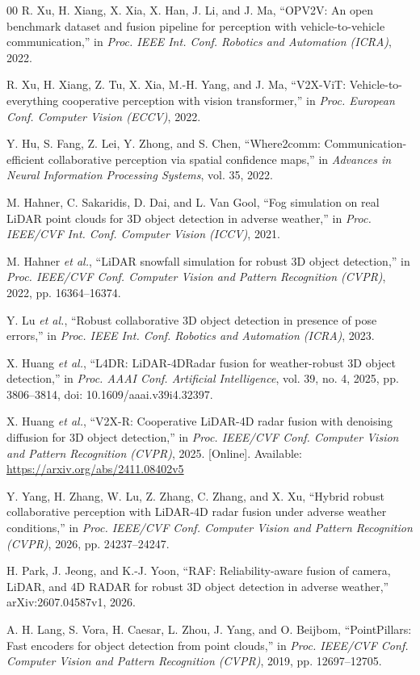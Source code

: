 \begin{thebibliography}{00}
R. Xu, H. Xiang, X. Xia, X. Han, J. Li, and J. Ma, ``OPV2V: An open benchmark dataset and fusion pipeline for perception with vehicle-to-vehicle communication,'' in \emph{Proc. IEEE Int. Conf. Robotics and Automation (ICRA)}, 2022.

R. Xu, H. Xiang, Z. Tu, X. Xia, M.-H. Yang, and J. Ma, ``V2X-ViT: Vehicle-to-everything cooperative perception with vision transformer,'' in \emph{Proc. European Conf. Computer Vision (ECCV)}, 2022.

Y. Hu, S. Fang, Z. Lei, Y. Zhong, and S. Chen, ``Where2comm: Communication-efficient collaborative perception via spatial confidence maps,'' in \emph{Advances in Neural Information Processing Systems}, vol. 35, 2022.

M. Hahner, C. Sakaridis, D. Dai, and L. Van Gool, ``Fog simulation on real LiDAR point clouds for 3D object detection in adverse weather,'' in \emph{Proc. IEEE/CVF Int. Conf. Computer Vision (ICCV)}, 2021.

M. Hahner \emph{et al.}, ``LiDAR snowfall simulation for robust 3D object detection,'' in \emph{Proc. IEEE/CVF Conf. Computer Vision and Pattern Recognition (CVPR)}, 2022, pp. 16364--16374.

Y. Lu \emph{et al.}, ``Robust collaborative 3D object detection in presence of pose errors,'' in \emph{Proc. IEEE Int. Conf. Robotics and Automation (ICRA)}, 2023.

X. Huang \emph{et al.}, ``L4DR: LiDAR-4DRadar fusion for weather-robust 3D object detection,'' in \emph{Proc. AAAI Conf. Artificial Intelligence}, vol. 39, no. 4, 2025, pp. 3806--3814, doi: 10.1609/aaai.v39i4.32397.

X. Huang \emph{et al.}, ``V2X-R: Cooperative LiDAR-4D radar fusion with denoising diffusion for 3D object detection,'' in \emph{Proc. IEEE/CVF Conf. Computer Vision and Pattern Recognition (CVPR)}, 2025. [Online]. Available: \url{https://arxiv.org/abs/2411.08402v5}

Y. Yang, H. Zhang, W. Lu, Z. Zhang, C. Zhang, and X. Xu, ``Hybrid robust collaborative perception with LiDAR-4D radar fusion under adverse weather conditions,'' in \emph{Proc. IEEE/CVF Conf. Computer Vision and Pattern Recognition (CVPR)}, 2026, pp. 24237--24247.

H. Park, J. Jeong, and K.-J. Yoon, ``RAF: Reliability-aware fusion of camera, LiDAR, and 4D RADAR for robust 3D object detection in adverse weather,'' arXiv:2607.04587v1, 2026.

A. H. Lang, S. Vora, H. Caesar, L. Zhou, J. Yang, and O. Beijbom, ``PointPillars: Fast encoders for object detection from point clouds,'' in \emph{Proc. IEEE/CVF Conf. Computer Vision and Pattern Recognition (CVPR)}, 2019, pp. 12697--12705.
\end{thebibliography}
